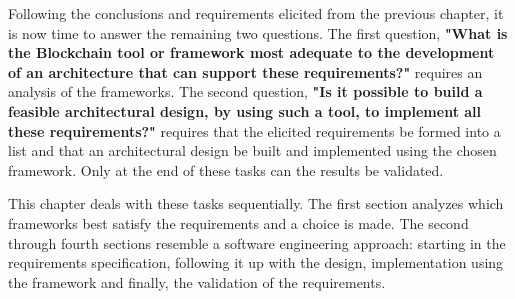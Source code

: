 

Following the conclusions and requirements elicited from the previous chapter, it is now time to answer the remaining two questions. The first question, \textbf{"What is the Blockchain tool or framework most adequate to the development of an architecture that can support these requirements?"} requires an analysis of the frameworks. The second question, \textbf{"Is it possible to build a feasible architectural design, by using such a tool, to implement all these requirements?"} requires that the elicited requirements be formed into a list and that an architectural design be built and implemented using the chosen framework. Only at the end of these tasks can the results be validated. 

This chapter deals with these tasks sequentially. The first section analyzes which frameworks best satisfy the requirements and a choice is made. The second through fourth sections resemble a software engineering approach: starting in the requirements specification, following it up with the design, implementation using the framework and finally, the validation of the requirements.